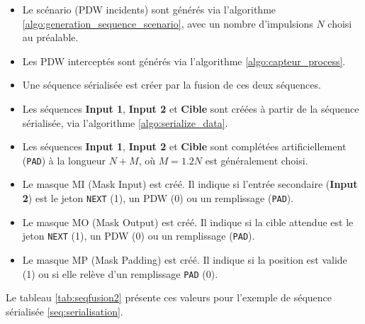 \begin{itemize}
\item Le scénario (PDW incidents) sont générés via l'algorithme \ref{algo:generation_sequence_scenario}, avec un nombre d'impulsions $N$ choisi au préalable.
\item Les PDW interceptés sont générés via l'algorithme \ref{algo:capteur_process}.
\item Une séquence sérialisée est créer par la fusion de ces deux séquences.
\item Les séquences \textbf{Input 1}, \textbf{Input 2} et \textbf{Cible} sont créées à partir de la séquence sérialisée, via l'algorithme \ref{algo:serialize_data}.
\item Les séquences \textbf{Input 1}, \textbf{Input 2} et \textbf{Cible} sont complétées artificiellement (\texttt{PAD}) à la longueur $N + M$, où $M = 1.2N$ est généralement choisi.
\item Le masque MI (Mask Input) est créé. Il indique si l'entrée secondaire (\textbf{Input 2}) est le jeton \texttt{NEXT} (1), un PDW (0) ou un remplissage (\texttt{PAD}).
\item Le masque MO (Mask Output) est créé. Il indique si la cible attendue est le jeton \texttt{NEXT} (1), un PDW (0) ou un remplissage (\texttt{PAD}). 
\item Le masque MP (Mask Padding) est créé. Il indique si la position est valide (1) ou si elle relève d'un remplissage \texttt{PAD} (0).\\
\end{itemize}   

Le tableau \ref{tab:seqfusion2} présente ces valeurs pour l'exemple de séquence sérialisée \ref{seq:serialisation}.\\

